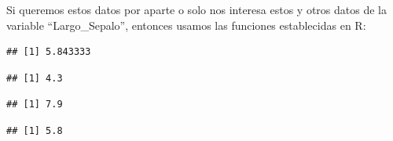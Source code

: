 \documentclass[
]{book}
\newenvironment{Shaded}{\begin{snugshade}}{\end{snugshade}}
\newcommand{\CommentTok}[1]{\textcolor[rgb]{0.56,0.35,0.01}{\textit{#1}}}
\newcommand{\FloatTok}[1]{\textcolor[rgb]{0.00,0.00,0.81}{#1}}
\newcommand{\FunctionTok}[1]{\textcolor[rgb]{0.13,0.29,0.53}{\textbf{#1}}}
\newcommand{\NormalTok}[1]{#1}
\newcommand{\SpecialCharTok}[1]{\textcolor[rgb]{0.81,0.36,0.00}{\textbf{#1}}}
\begin{document}
\hfill\break
Si queremos estos datos por aparte o solo nos interesa estos y otros datos de la variable ``Largo\_Sepalo'', entonces usamos las funciones establecidas en R:\\

\begin{Shaded}
\end{Shaded}

\begin{verbatim}
## [1] 5.843333
\end{verbatim}

\begin{Shaded}
\end{Shaded}

\begin{verbatim}
## [1] 4.3
\end{verbatim}

\begin{Shaded}
\end{Shaded}

\begin{verbatim}
## [1] 7.9
\end{verbatim}

\begin{Shaded}
\end{Shaded}

\begin{verbatim}
## [1] 5.8
\end{verbatim}

\begin{Shaded}
\end{Shaded}
\end{document}
